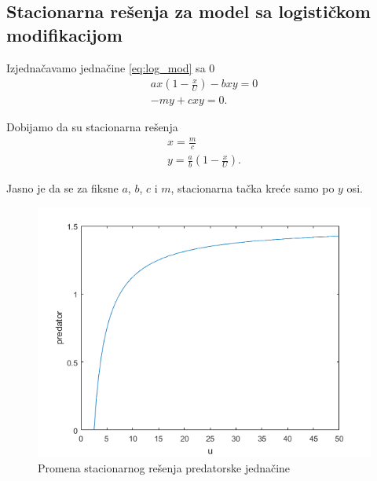\documentclass[a4paper]{article}
\begin{document}
\subsection{Stacionarna rešenja za model sa logističkom modifikacijom}

Izjednačavamo jednačine \eqref{eq:log_mod} sa 0
\begin{displaymath}
    \begin{aligned}
        ax(1 - \frac{x}{U}) - bxy = 0\\
        -my + cxy = 0.
    \end{aligned}
\end{displaymath}

Dobijamo da su stacionarna rešenja
\begin{displaymath}
    \begin{aligned}
        x = \frac{m}{c}\\
        y = \frac{a}{b}(1 - \frac{x}{U}).
    \end{aligned}
\end{displaymath}

Jasno je da se za fiksne $a$, $b$, $c$ i $m$,
stacionarna tačka kreće samo po $y$ osi.

\begin{figure}[H]
    \centering
    \begin{minipage}{0.75\textwidth}
        \centering
        \includegraphics[width=1\textwidth]{images/predator_vs_u} %
        \caption{Promena stacionarnog rešenja predatorske jednačine}
    \end{minipage}
\end{figure}
\end{document}
